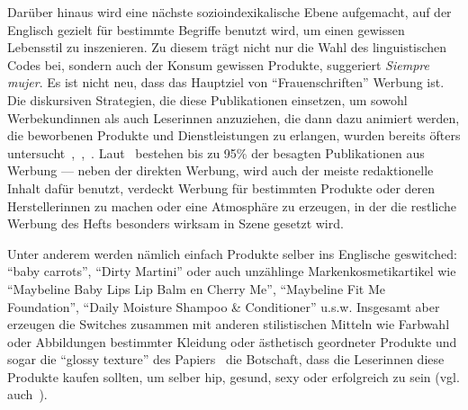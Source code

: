 Darüber hinaus wird eine nächste sozioindexikalische Ebene aufgemacht, auf der Englisch gezielt für bestimmte Begriffe benutzt wird, um einen gewissen Lebensstil zu inszenieren.
Zu diesem trägt nicht nur die Wahl des linguistischen Codes bei, sondern auch der Konsum gewissen Produkte, suggeriert \textit{Siempre mujer}.
Es ist nicht neu, dass das Hauptziel von ``Frauenschriften'' Werbung ist.
Die diskursiven Strategien, die diese Publikationen einsetzen, um sowohl Werbekundinnen als auch Leserinnen anzuziehen, die dann dazu animiert werden, die beworbenen Produkte und Dienstleistungen zu erlangen, wurden bereits öfters untersucht~\cite{McCracken93},~\cite{Talbot95},~\cite{Beer2002}.
Laut~\cite[S.6]{McCracken93} bestehen bis zu 95\% der besagten Publikationen aus Werbung — neben der direkten Werbung, wird auch der meiste redaktionelle Inhalt dafür benutzt, verdeckt Werbung für bestimmten Produkte oder deren Herstellerinnen zu machen oder eine Atmosphäre zu erzeugen, in der die restliche Werbung des Hefts besonders wirksam in Szene gesetzt wird.

Unter anderem werden nämlich einfach Produkte selber ins Englische geswitched: ``baby carrots'', ``Dirty Martini'' oder auch unzählinge Markenkosmetikartikel wie ``Maybeline Baby Lips Lip Balm en Cherry Me'', ``Maybeline Fit Me Foundation'', ``Daily Moisture Shampoo \& Conditioner'' u.s.w.
Insgesamt aber erzeugen die Switches zusammen mit anderen stilistischen Mitteln wie Farbwahl oder Abbildungen bestimmter Kleidung oder ästhetisch geordneter Produkte und sogar die ``glossy texture'' des Papiers~\cite[S.6]{McCracken93} die Botschaft, dass die Leserinnen diese Produkte kaufen sollten, um selber hip, gesund, sexy oder erfolgreich zu sein (vgl. auch~\cite{Eckert08}).

